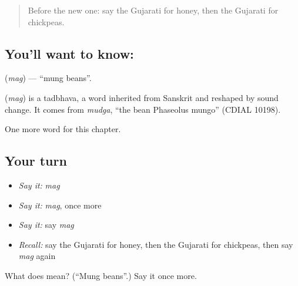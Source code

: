 \label{lesson:GU-C113-mag}



\begin{quote}
Before the new one: say the Gujarati for honey, then the Gujarati for chickpeas.
\end{quote}

\subsection*{You'll want to know: }
\textbf{} (\emph{mag}) — \textquotedblleft{}mung beans\textquotedblright{}.

\begin{cousinweb}
\textbf{} (\emph{mag}) is a tadbhava, a word inherited from Sanskrit and reshaped by sound change. It comes from \emph{mudga}, \textquotedblleft{}the bean Phaseolus mungo\textquotedblright{} (CDIAL 10198).
\end{cousinweb}

\begin{grammarlens}[title={What you've built}]
One more word for this chapter.
\end{grammarlens}

\subsection*{Your turn}
\begin{itemize}
\raggedright
  \item \emph{Say it:} \emph{mag}
  \item \emph{Say it:} \emph{mag}, once more
  \item \emph{Say it:} say \emph{mag}
  \item \emph{Recall:} say the Gujarati for honey, then the Gujarati for chickpeas, then say \emph{mag} again
\end{itemize}

\begin{tcolorbox}[breakable,colback=teal!4,colframe=teal!35!black,title={Before you move on}]
What does  mean? (\textquotedblleft{}Mung beans\textquotedblright{}.) Say it once more.
\end{tcolorbox}
